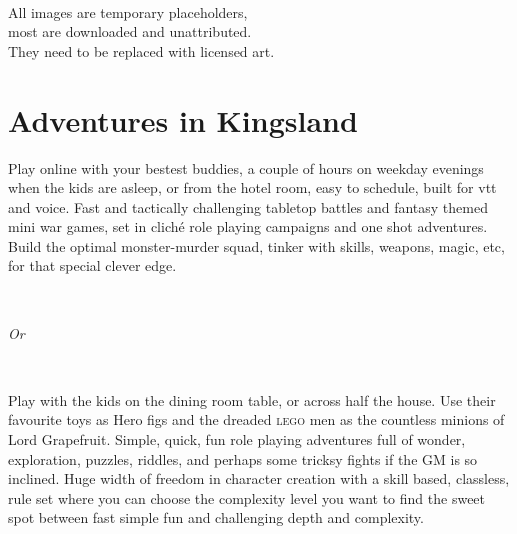 \

\noindent
All images are temporary placeholders, \\
most are downloaded and unattributed.\\
They need to be replaced with licensed art.

\normalsize






\cleardoublepage
\pagestyle{fancy}
\raggedbottom






\section*{Adventures in Kingsland}

\noindent
Play online with your bestest buddies, a couple of hours on weekday evenings when the kids are asleep, or from the hotel room, easy to schedule, built for vtt and voice.
Fast and tactically challenging tabletop battles and fantasy themed mini war games, set in cliché role playing campaigns and one shot adventures. 
Build the optimal monster-murder squad, tinker with skills, weapons, magic, etc, for that special clever edge.

\

\emph{Or}

\

\noindent
Play with the kids on the dining room table, or across half the house. Use their favourite toys as Hero figs and the dreaded \textsc{lego} men as the countless minions of Lord Grapefruit.
Simple, quick, fun role playing adventures full of wonder, exploration, puzzles, riddles, and perhaps some tricksy fights if the GM is so inclined. 
Huge width of freedom in character creation with a skill based, classless, rule set where you can choose the complexity level you want to find the sweet spot between fast simple fun and challenging depth and complexity.

